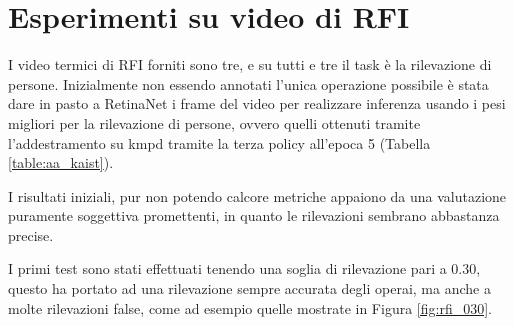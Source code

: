 \section{Esperimenti su video di RFI}
\label{sec:RFI_video_experiment}

I video termici di \ac{RFI} forniti sono tre, e su tutti e tre il task è la rilevazione di persone. Inizialmente non essendo annotati l'unica operazione possibile è stata dare in pasto a RetinaNet i frame del video per realizzare inferenza usando i pesi migliori per la rilevazione di persone, ovvero quelli ottenuti tramite l'addestramento su \ac{kmpd} tramite la terza policy all'epoca 5 (Tabella \ref{table:aa_kaist}). 

I risultati iniziali, pur non potendo calcore metriche appaiono da una valutazione puramente soggettiva promettenti, in quanto le rilevazioni sembrano abbastanza precise. 

I primi test sono stati effettuati tenendo una soglia di rilevazione pari a $0.30$, questo ha portato ad una rilevazione sempre accurata degli operai, ma anche a molte rilevazioni false, come ad esempio quelle mostrate in Figura \ref{fig:rfi_030}. 

